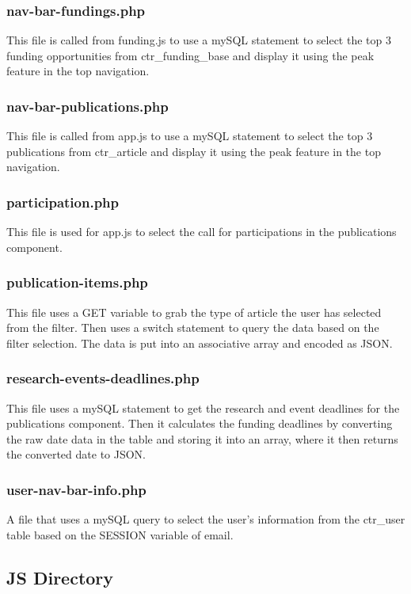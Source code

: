 \documentclass[onecolumn]{IEEEtran}
\begin{document}
\subsubsection{nav-bar-fundings.php}
This file is called from funding.js to use a mySQL statement to select the top 3 funding opportunities from ctr\_funding\_base and display it using the peak feature in the top navigation. 

\subsubsection{nav-bar-publications.php}
This file is called from app.js to use a mySQL statement to select the top 3 publications from ctr\_article and display it using the peak feature in the top navigation. 

\subsubsection{participation.php}
This file is used for app.js to select the call for participations in the publications component.   

\subsubsection{publication-items.php}
This file uses a GET variable to grab the type of article the user has selected from the filter. Then uses a switch statement to query the data based on the filter selection. The data is put into an associative array and encoded as JSON. 

\subsubsection{research-events-deadlines.php}
This file uses a mySQL statement to get the research and event deadlines for the publications component. Then it calculates the funding deadlines by converting the raw date data in the table and storing it into an array, where it then returns the converted date to JSON. 

\subsubsection{user-nav-bar-info.php}
A file that uses a mySQL query to select the user's information from the ctr\_user table based on the SESSION variable of email. 
 
\subsection{ JS Directory }
\end{document}

